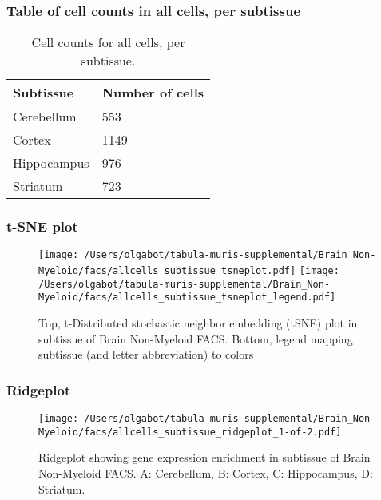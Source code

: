\subsubsection{Table of cell counts in all cells, per subtissue}\begin{table}[h]
\centering
\label{my-label}
\begin{tabular}{@{}ll@{}}
\toprule

Subtissue& Number of cells \\ \midrule
Cerebellum & 553 \\

Cortex & 1149 \\

Hippocampus & 976 \\

Striatum & 723 \\
\bottomrule
\end{tabular}
\caption{Cell counts for all cells, per subtissue.}
\end{table}

\clearpage
\subsubsection{t-SNE plot}
\begin{figure}[h]
\centering
\texttt{[image: /Users/olgabot/tabula-muris-supplemental/Brain\_Non-Myeloid/facs/allcells\_subtissue\_tsneplot.pdf]}
\texttt{[image: /Users/olgabot/tabula-muris-supplemental/Brain\_Non-Myeloid/facs/allcells\_subtissue\_tsneplot\_legend.pdf]}
\caption{Top, t-Distributed stochastic neighbor embedding (tSNE) plot  in subtissue of Brain Non-Myeloid FACS. Bottom, legend mapping subtissue (and letter abbreviation) to colors}
\end{figure}


\clearpage
\clearpage
\subsubsection{Ridgeplot}
\begin{figure}[h]
\centering
\texttt{[image: /Users/olgabot/tabula-muris-supplemental/Brain\_Non-Myeloid/facs/allcells\_subtissue\_ridgeplot\_1-of-2.pdf]}

\caption{ Ridgeplot  showing gene expression enrichment in subtissue of Brain Non-Myeloid FACS. A: Cerebellum, B: Cortex, C: Hippocampus, D: Striatum.}
\end{figure}


